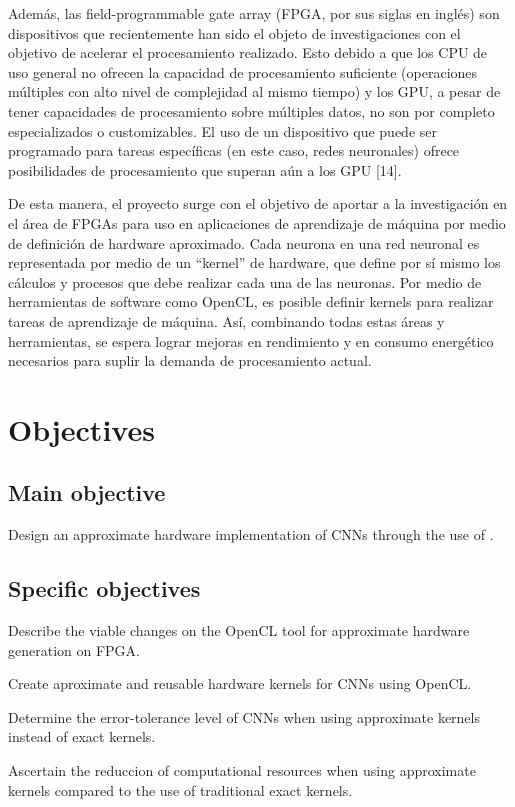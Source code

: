 Además, las field-programmable gate array (FPGA, por sus siglas en inglés) son dispositivos que
recientemente han sido el objeto de investigaciones con el objetivo de acelerar el procesamiento
realizado. Esto debido a que los CPU de uso general no ofrecen la capacidad de procesamiento
suficiente (operaciones múltiples con alto nivel de complejidad al mismo tiempo) y los GPU, a pesar de
tener capacidades de procesamiento sobre múltiples datos, no son por completo especializados o
customizables. El uso de un dispositivo que puede ser programado para tareas específicas (en este caso,
redes neuronales) ofrece posibilidades de procesamiento que superan aún a los GPU [14].

De esta manera, el proyecto surge con el objetivo de aportar a la investigación en el área de FPGAs para
uso en aplicaciones de aprendizaje de máquina por medio de definición de hardware aproximado. Cada
neurona en una red neuronal es representada por medio de un “kernel” de hardware, que define por sí
mismo los cálculos y procesos que debe realizar cada una de las neuronas. Por medio de herramientas
de software como OpenCL, es posible definir kernels para realizar tareas de aprendizaje de máquina.
Así, combinando todas estas áreas y herramientas, se espera lograr mejoras en rendimiento y en
consumo energético necesarios para suplir la demanda de procesamiento actual.

\section{Objectives}

\subsection{Main objective}

Design an approximate hardware implementation of CNNs through the 
use of \intelOCL.

\subsection{Specific objectives}

\begin{compactitem}
    \item Describe the viable changes on the OpenCL tool for approximate hardware generation on FPGA.
    \item Create aproximate and reusable hardware kernels for CNNs using OpenCL.
    \item Determine the error-tolerance level of CNNs when using approximate kernels instead of exact kernels.
    \item Ascertain the reduccion of computational resources when using approximate kernels compared to the use of traditional exact kernels.
\end{compactitem}

